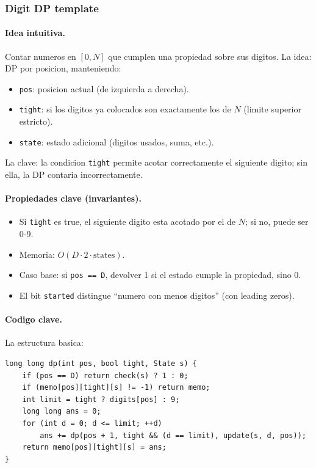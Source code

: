 ﻿\subsubsection{Digit DP template}

\paragraph{Idea intuitiva.}
Contar numeros en $[0, N]$ que cumplen una propiedad sobre sus digitos. La idea: DP por posicion, manteniendo:
\begin{itemize}\setlength\itemsep{0pt}
	\item \texttt{pos}: posicion actual (de izquierda a derecha).
	\item \texttt{tight}: si los digitos ya colocados son exactamente los de $N$ (limite superior estricto).
	\item \texttt{state}: estado adicional (digitos usados, suma, etc.).
\end{itemize}
La clave: la condicion \texttt{tight} permite acotar correctamente el siguiente digito; sin ella, la DP contaria incorrectamente.

\paragraph{Propiedades clave (invariantes).}
\begin{itemize}\setlength\itemsep{0pt}
	\item Si \texttt{tight} es true, el siguiente digito esta acotado por el de $N$; si no, puede ser 0-9.
	\item Memoria: $O(D \cdot 2 \cdot \text{states})$.
	\item Caso base: si \texttt{pos == D}, devolver 1 si el estado cumple la propiedad, sino 0.
	\item El bit \texttt{started} distingue ``numero con menos digitos'' (con leading zeros).
\end{itemize}

\paragraph{Codigo clave.}
La estructura basica:
\begin{verbatim}
long long dp(int pos, bool tight, State s) {
    if (pos == D) return check(s) ? 1 : 0;
    if (memo[pos][tight][s] != -1) return memo;
    int limit = tight ? digits[pos] : 9;
    long long ans = 0;
    for (int d = 0; d <= limit; ++d)
        ans += dp(pos + 1, tight && (d == limit), update(s, d, pos));
    return memo[pos][tight][s] = ans;
}
\end{verbatim}

